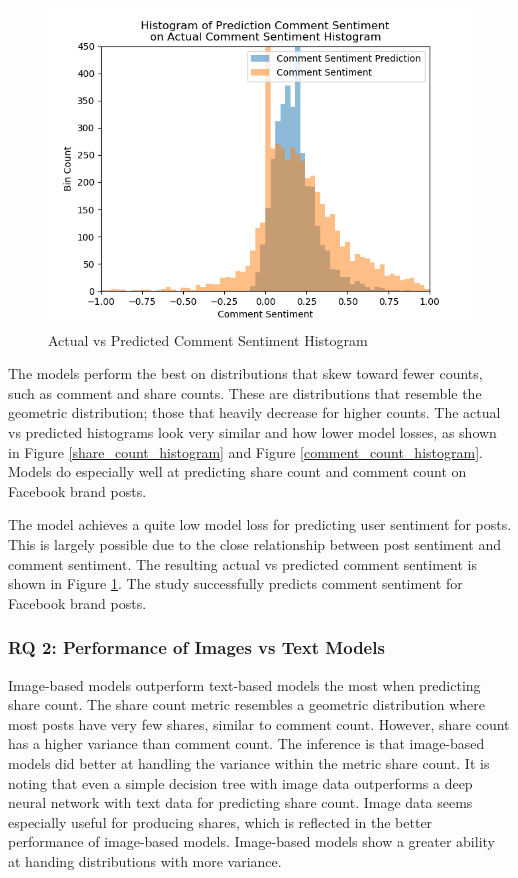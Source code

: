\documentclass[mksc,blindrev]{informs3} %
\begin{document}
\begin{figure}
\centering
\includegraphics[width=\columnwidth]{images/Sentiment_Prediction_vs_Actual.png}
\caption{Actual vs Predicted Comment Sentiment Histogram}
\label{comment_sentiment_histogram}
\end{figure}

The models perform the best on distributions that skew toward fewer counts, such as comment and share counts. These are distributions that resemble the geometric distribution; those that heavily decrease for higher counts. The actual vs predicted histograms look very similar and how lower model losses, as shown in Figure \ref{share_count_histogram} and Figure \ref{comment_count_histogram}. Models do especially well at predicting share count and comment count on Facebook brand posts.

The model achieves a quite low model loss for predicting user sentiment for posts. This is largely possible due to the close relationship between post sentiment and comment sentiment. The resulting actual vs predicted comment sentiment is shown in Figure \ref{comment_sentiment_histogram}. The study successfully predicts comment sentiment for Facebook brand posts.

\subsubsection{RQ 2: Performance of Images vs Text Models}

Image-based models outperform text-based models the most when predicting share count. The share count metric resembles a geometric distribution where most posts have very few shares, similar to comment count. However, share count has a higher variance than comment count. The inference is that image-based models did better at handling the variance within the metric share count. It is noting that even a simple decision tree with image data outperforms a deep neural network with text data for predicting share count. Image data seems especially useful for producing shares, which is reflected in the better performance of image-based models. Image-based models show a greater ability at handing distributions with more variance.
\end{document}
